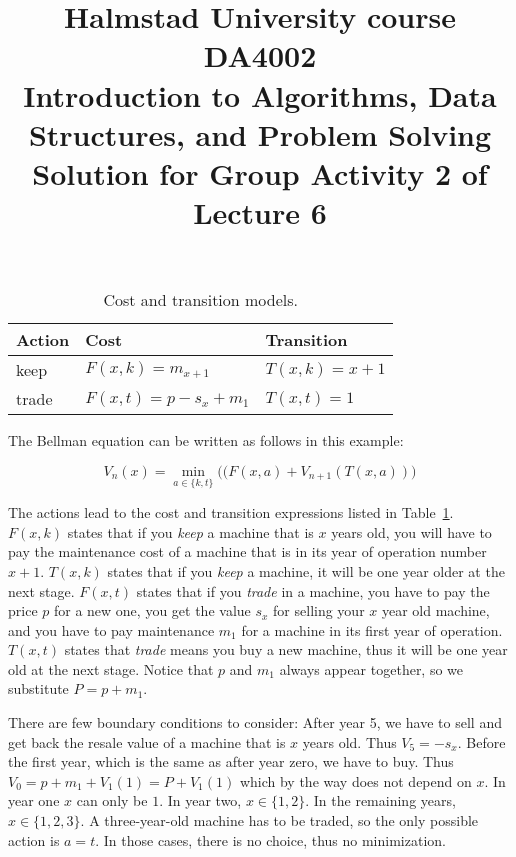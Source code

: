 \documentclass[a4paper]{article}
\begin{document}
\title{
  {\small
    Halmstad University course DA4002\\
    Introduction to Algorithms, Data Structures, and Problem Solving\\
  }
  Solution for Group Activity 2 of Lecture 6
}
\maketitle

\begin{table}
  \caption{Cost and transition models.}\label{tab:actions}
  \centering
  \begin{tabular}{lll}
    \toprule
    Action & Cost & Transition \\
    \midrule
    keep   & $F(x,k) = m_{x+1}$       & $T(x,k) = x+1$ \\
    trade  & $F(x,t) = p - s_x + m_1$ & $T(x,t) = 1$ \\
    \bottomrule
  \end{tabular}
\end{table}

The Bellman equation can be written as follows in this example:

\begin{equation}
  V_n(x) = \min_{a\in\{k,t\}} \big((F(x,a) + V_{n+1}(T(x,a)) \big)
\end{equation}

The actions lead to the cost and transition expressions listed in Table~\ref{tab:actions}.
$F(x,k)$ states that if you \emph{keep} a machine that is $x$ years old, you will have to pay the maintenance cost of a machine that is in its year of operation number $x+1$.
$T(x,k)$ states that if you \emph{keep} a machine, it will be one year older at the next stage.
$F(x,t)$ states that if you \emph{trade} in a machine, you have to pay the price $p$ for a new one, you get the value $s_x$ for selling your $x$ year old machine, and you have to pay maintenance $m_1$ for a machine in its first year of operation.
$T(x,t)$ states that \emph{trade} means you buy a new machine, thus it will be one year old at the next stage.
Notice that $p$ and $m_1$ always appear together, so we substitute $P=p+m_1$.

There are few boundary conditions to consider:
After year 5, we have to sell and get back the resale value of a machine that is $x$ years old.
Thus $V_5 = -s_x$.
Before the first year, which is the same as after year zero, we have to buy.
Thus $V_0 = p + m_1 + V_1(1) = P + V_1(1)$ which by the way does not depend on $x$.
In year one $x$ can only be $1$.
In year two, $x\in\{1,2\}$.
In the remaining years, $x\in\{1,2,3\}$.
A three-year-old machine has to be traded, so the only possible action is $a=t$.
In those cases, there is no choice, thus no minimization.
\end{document}
